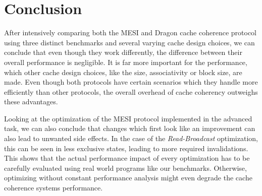 \section{Conclusion}
After intensively comparing both the MESI and Dragon cache coherence protocol
using three distinct benchmarks and several varying cache design choices, we can
conclude that even though they work differently, the difference between their
overall performance is negligible. It is far more important for the performance, which other cache design
choices, like the size, associativity or block size, are made. Even though both
protocols have certain scenarios which they handle more efficiently than other
protocols, the overall overhead of cache coherency outweighs these advantages.

Looking at the optimization of the MESI protocol implemented in the advanced
task, we can also conclude that changes which first look like an improvement can
also lead to unwanted side effects. In the case of the \emph{Read-Broadcast}
optimization, this can be seen in less exclusive states, leading to more
required invalidations. This shows that the actual performance impact of every
optimization has to be carefully evaluated using real world programs like our
benchmarks. Otherwise, optimizing without constant performance analysis might
even degrade the cache coherence systems performance.
